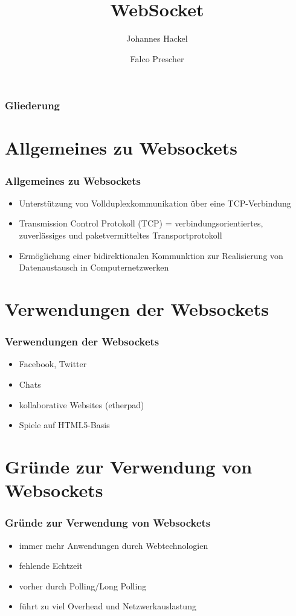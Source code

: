 \documentclass{beamer}
\author{Johannes Hackel\and Falco Prescher}
\title{WebSocket}
\begin{document}
\begin{frame}
\titlepage
\end{frame}

\begin{frame}
\frametitle{Gliederung}
\tableofcontents
\end{frame}

\section{Allgemeines zu Websockets}
\begin{frame}
\frametitle{Allgemeines zu Websockets}
\begin{itemize}
\item Unterstützung von Vollduplexkommunikation über eine TCP-Verbindung
\item Transmission Control Protokoll (TCP) = verbindungsorientiertes, zuverlässiges und paketvermitteltes Transportprotokoll
\item Ermöglichung einer bidirektionalen Kommunktion zur Realisierung von Datenaustausch in Computernetzwerken
\end{itemize}
\end{frame}

\section{Verwendungen der Websockets}
\begin{frame}
\frametitle{Verwendungen der Websockets}
\begin{itemize}
\item Facebook, Twitter
\item Chats
\item kollaborative Websites (etherpad)
\item Spiele auf HTML5-Basis
\end{itemize}
\end{frame}

\section{Gründe zur Verwendung von Websockets}
\begin{frame}
\frametitle{Gründe zur Verwendung von Websockets}
\begin{itemize}
\item immer mehr Anwendungen durch Webtechnologien
\item fehlende Echtzeit
\item vorher durch Polling/Long Polling
\item führt zu viel Overhead und Netzwerkauslastung
\end{itemize}
\end{frame}
\end{document}
